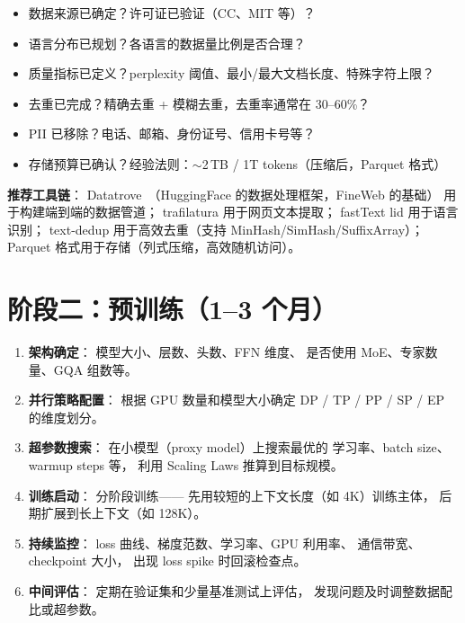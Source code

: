 \begin{keybox}
\begin{itemize}[noitemsep]
  \item[\textbullet] 数据来源已确定？许可证已验证（CC、MIT 等）？
  \item[\textbullet] 语言分布已规划？各语言的数据量比例是否合理？
  \item[\textbullet] 质量指标已定义？perplexity 阈值、最小/最大文档长度、特殊字符上限？
  \item[\textbullet] 去重已完成？精确去重 + 模糊去重，去重率通常在 30--60\%？
  \item[\textbullet] PII 已移除？电话、邮箱、身份证号、信用卡号等？
  \item[\textbullet] 存储预算已确认？经验法则：$\sim$2\,TB / 1T tokens（压缩后，Parquet 格式）
\end{itemize}
\end{keybox}

\textbf{推荐工具链}：
Datatrove~\cite{penedo2024fineweb}（HuggingFace 的数据处理框架，FineWeb 的基础）
用于构建端到端的数据管道；
trafilatura 用于网页文本提取；
fastText lid 用于语言识别；
text-dedup 用于高效去重（支持 MinHash/SimHash/SuffixArray）；
Parquet 格式用于存储（列式压缩，高效随机访问）。

\section{阶段二：预训练（1--3 个月）}

\begin{enumerate}[noitemsep]
  \item \textbf{架构确定}：
        模型大小、层数、头数、FFN 维度、
        是否使用 MoE、专家数量、GQA 组数等。
  \item \textbf{并行策略配置}：
        根据 GPU 数量和模型大小确定
        DP / TP / PP / SP / EP 的维度划分。
  \item \textbf{超参数搜索}：
        在小模型（proxy model）上搜索最优的
        学习率、batch size、warmup steps 等，
        利用 Scaling Laws 推算到目标规模。
  \item \textbf{训练启动}：
        分阶段训练——
        先用较短的上下文长度（如 4K）训练主体，
        后期扩展到长上下文（如 128K）。
  \item \textbf{持续监控}：
        loss 曲线、梯度范数、学习率、GPU 利用率、
        通信带宽、checkpoint 大小，
        出现 loss spike 时回滚检查点。
  \item \textbf{中间评估}：
        定期在验证集和少量基准测试上评估，
        发现问题及时调整数据配比或超参数。
\end{enumerate}

